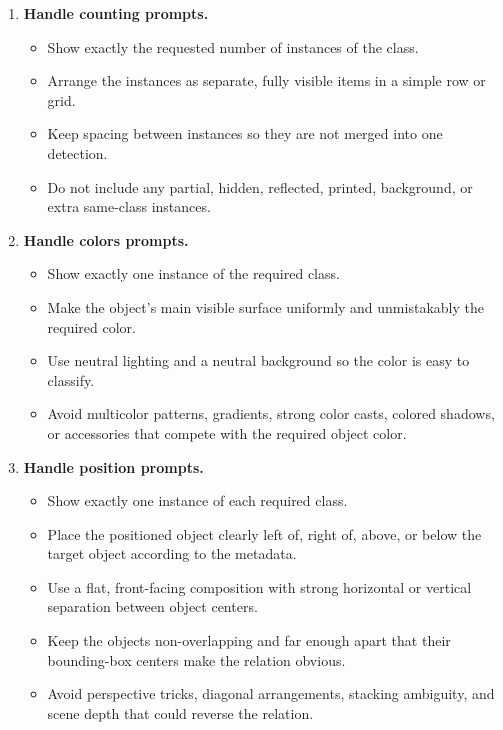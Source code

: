 \documentclass{llmxive}
\begin{document}
\begin{tcolorbox}
\begin{enumerate}[leftmargin=1.5em, itemsep=0.2em]
    \item \textbf{Handle counting prompts.}
    \begin{itemize}[leftmargin=1.5em, nosep]
        \item Show exactly the requested number of instances of the class.
        \item Arrange the instances as separate, fully visible items in a simple row or grid.
        \item Keep spacing between instances so they are not merged into one detection.
        \item Do not include any partial, hidden, reflected, printed, background, or extra same-class instances.
    \end{itemize}

    \item \textbf{Handle colors prompts.}
    \begin{itemize}[leftmargin=1.5em, nosep]
        \item Show exactly one instance of the required class.
        \item Make the object's main visible surface uniformly and unmistakably the required color.
        \item Use neutral lighting and a neutral background so the color is easy to classify.
        \item Avoid multicolor patterns, gradients, strong color casts, colored shadows, or accessories that compete with the required object color.
    \end{itemize}

    \item \textbf{Handle position prompts.}
    \begin{itemize}[leftmargin=1.5em, nosep]
        \item Show exactly one instance of each required class.
        \item Place the positioned object clearly left of, right of, above, or below the target object according to the metadata.
        \item Use a flat, front-facing composition with strong horizontal or vertical separation between object centers.
        \item Keep the objects non-overlapping and far enough apart that their bounding-box centers make the relation obvious.
        \item Avoid perspective tricks, diagonal arrangements, stacking ambiguity, and scene depth that could reverse the relation.
    \end{itemize}


\end{enumerate}
\end{tcolorbox}
\end{document}
